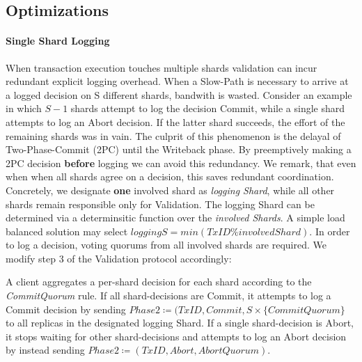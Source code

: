 \subsection{Optimizations}


\paragraph{Single Shard Logging}

When transaction execution touches multiple shards validation can incur redundant explicit logging overhead. When a Slow-Path is necessary to arrive at a logged decision on S different shards, bandwith is wasted. Consider an example in which $S-1$ shards attempt to log the decision Commit, while a single shard attempts to log an Abort decision. If the latter shard succeeds, the effort of the remaining shards was in vain. 
The culprit of this phenomenon is the delayal of Two-Phase-Commit (2PC) until the Writeback phase. By preemptively making a 2PC decision \textbf{before} logging we can avoid this redundancy. We remark, that even when when all shards agree on a decision, this saves redundant coordination.
Concretely, we designate \textbf{one} involved shard as \textit{logging Shard}, while all other shards remain responsible only for Validation. The logging Shard can be determined via a determinsitic function over the \textit{involved Shards}. A simple load balanced solution may select $loggingS = min(TxID \% involvedShard)$.  In order to log a decision, voting quorums from all involved shards are required. We modify step 3 of the Validation protocol accordingly:

A client aggregates a per-shard decision for each shard according to the \textit{CommitQuorum} rule. If all shard-decisions are Commit, it attempts to log a Commit decision by sending $Phase2 \coloneqq (TxID, Commit, S \times \{CommitQuorum\}$ to all replicas in the designated logging Shard. If a single shard-decision is Abort, it stops waiting for other shard-decisions and attempts to log an Abort decision by instead sending $Phase2 \coloneqq (TxID, Abort, AbortQuorum)$. 

